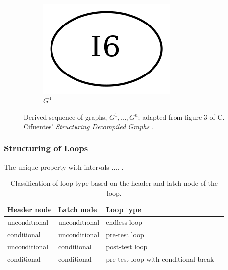 \begin{figure}[htbp]
\begin{subfigure}[b]{0.08\textwidth}
		\includegraphics[width=\textwidth]{inc/3_background/interval_method/derived_sequence_of_graphs/G_4.png}
		\vspace{2em}
		\caption{$G^4$}
	\end{subfigure}
	\caption{Derived sequence of graphs, $G^1, ..., G^n$; adapted from figure 3 of C. Cifuentes' \textit{Structuring Decompiled Graphs} \cite{structuring_decompiled_graphs}.}
	\label{fig:derived_sequence_of_graphs}
\end{figure}


\subsubsection{Structuring of Loops}

The unique property with intervals .... .

\begin{table}[htbp]
	\begin{center}
		\begin{tabular}{|l|l|l|l|}
			\hline
			\textbf{Header node} & \textbf{Latch node} & \textbf{Loop type} \\
			\hline
			unconditional & unconditional & endless loop                         \\
			\hline
			conditional   & unconditional & pre-test loop                        \\
			\hline
			unconditional & conditional   & post-test loop                       \\
			\hline
			conditional   & conditional   & pre-test loop with conditional break \\
			\hline
		\end{tabular}
	\end{center}
	\label{tbl:loop_classification}
	\caption{Classification of loop type based on the header and latch node of the loop.}
\end{table}

